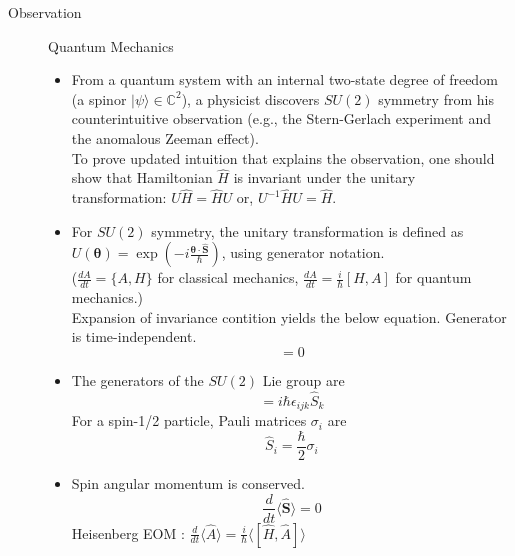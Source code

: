 \documentclass{article}
\begin{document}
\begin{description}
    \item[Observation]Quantum Mechanics
          \begin{itemize}
              \item From a quantum system with an internal two-state degree of freedom (a spinor $|\psi\rangle \in \mathbb{C}^2$), a physicist discovers $SU(2)$ symmetry from his counterintuitive observation (e.g., the Stern-Gerlach experiment and the anomalous Zeeman effect). \\
                    To prove updated intuition that explains the observation, one should show that  Hamiltonian $\hat{H}$ is invariant under the unitary transformation: $U\hat{H} = \hat{H} U$ or, $U^{-1} \hat{H} U = \hat{H}$.
              \item For $SU(2)$ symmetry, the unitary transformation is defined as $U(\boldsymbol{\theta}) = \exp\left(-i \frac{\boldsymbol{\theta} \cdot \hat{\mathbf{S}}}{\hbar}\right)$, using generator notation. \\
                    ($\frac{d A}{d t} = \{ A, H\}$ for classical mechanics, $\frac{d A}{d t} = \frac{i}{\hbar}[H,A]$ for quantum mechanics.)\\
                    Expansion of invariance contition yields the below equation. Generator is time-independent.
                    \begin{equation}
                        [\hat{H}, \hat{\mathbf{S}}] = 0
                    \end{equation}
              \item
                    The generators of the $SU(2)$ Lie group are
                    \begin{equation}
                        [\hat{S}_i, \hat{S}_j] = i\hbar \epsilon_{ijk} \hat{S}_k
                    \end{equation}
                    For a spin-1/2 particle, Pauli matrices $\sigma_i$ are
                    \begin{equation}
                        \hat{S}_i = \frac{\hbar}{2} \sigma_i
                    \end{equation}
              \item Spin angular momentum is conserved.
                    \begin{equation}
                        \frac{d}{dt} \langle \hat{\mathbf{S}} \rangle = 0
                    \end{equation}
                    Heisenberg EOM : $\frac{d}{dt}\langle \hat{A} \rangle = \frac{i}{\hbar} \langle [\hat{H}, \hat{A}] \rangle$

\end{itemize}
\end{description}
\end{document}
